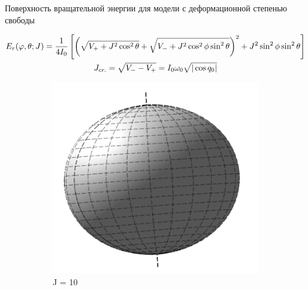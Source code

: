 \documentclass[hyperref={pdfpagelabels=false},usepdftitle=false, xcolor = dvipsnames]{beamer}
\begin{document}
\begin{frame}{Поверхность вращательной энергии для модели с деформационной степенью свободы}
  \begin{varblock}[11cm]{}

	 \scriptsize \begin{gather}
	  E_r (\varphi, \theta; J) = \frac{1}{4I_0} \left[ \left( \sqrt{V_{+} + J^2 \cos^2 \theta} + \sqrt{V_{-} + J^2 \cos^2 \phi \sin^2 \theta} \right)^2 + J^2 \sin^2 \phi \sin^2 \theta \right] \notag \\
	  J_{cr.} = \sqrt{V_{-} - V_{+}} = I_0 \omega_0 \sqrt{ | \cos q_0 |} \notag
	  \end{gather}
	\vspace*{-0.5cm}
  	  \begin{figure}
  	    \begin{subfigure}{0.3\textwidth}
		  \includegraphics[width=\textwidth]{../pictures/Rigid_RES_10.png}
		  \caption{J = 10}
	    \end{subfigure}
	    \begin{subfigure}{0.3\textwidth}

\end{subfigure}
\end{figure}
\end{varblock}
\end{frame}
\end{document}
